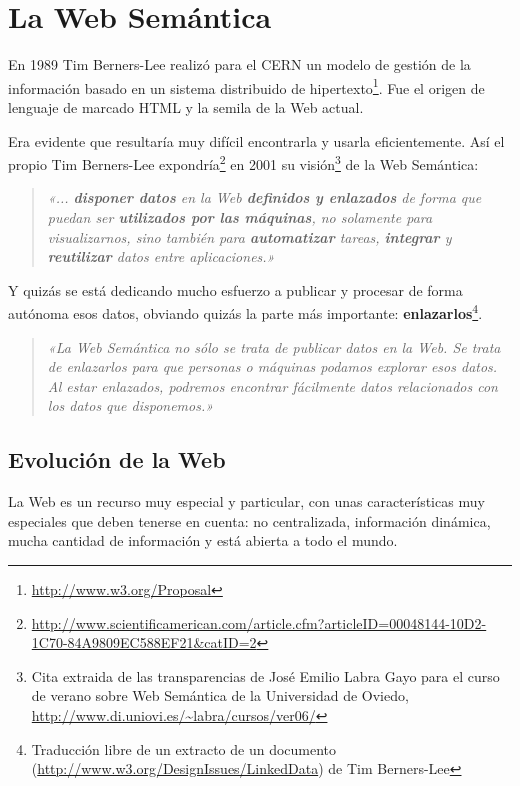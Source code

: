 
\section{La Web Semántica}

En 1989 Tim Berners-Lee realizó para el CERN un modelo de gestión de la 
información basado en un sistema distribuido de hipertexto\footnote{\url{http://www.w3.org/Proposal}}. 
Fue el origen de lenguaje de marcado HTML y la semila de la Web actual.

Era evidente que resultaría muy difícil encontrarla y usarla eficientemente. 
Así el propio Tim Berners-Lee 
expondría\footnote{\url{http://www.scientificamerican.com/article.cfm?articleID=00048144-10D2-1C70-84A9809EC588EF21&catID=2}}
en 2001 su visión\footnote{Cita extraida de las transparencias de José Emilio 
Labra Gayo para el curso de verano sobre Web Semántica de la Universidad de 
Oviedo, \url{http://www.di.uniovi.es/~labra/cursos/ver06/}} de la Web Semántica:

\begin{quote}
	\emph{«... \textbf{disponer datos} en la Web \textbf{definidos y enlazados} 
	de forma que puedan ser \textbf{utilizados por las máquinas}, no solamente 
	para visualizarnos, sino también para \textbf{automatizar} tareas, 
	\textbf{integrar} y \textbf{reutilizar} datos entre aplicaciones.»}
\end{quote} 

Y quizás se está dedicando mucho esfuerzo a publicar y procesar de forma autónoma
esos datos, obviando quizás la parte más importante: 
\textbf{enlazarlos}\footnote{Traducción libre de un extracto de un documento (\url{http://www.w3.org/DesignIssues/LinkedData}) de Tim Berners-Lee}.

\begin{quote}
	\emph{«La Web Semántica no sólo se trata de publicar datos en la Web. Se 
	trata de enlazarlos para que personas o máquinas podamos explorar esos 
	datos. Al estar enlazados, podremos encontrar fácilmente datos relacionados 
	con los datos que disponemos.»}
\end{quote}

\subsection{Evolución de la Web}

La Web es un recurso muy especial y particular, con unas características muy 
especiales que deben tenerse en cuenta: no centralizada, información dinámica,
mucha cantidad de información y está abierta a todo el mundo.

